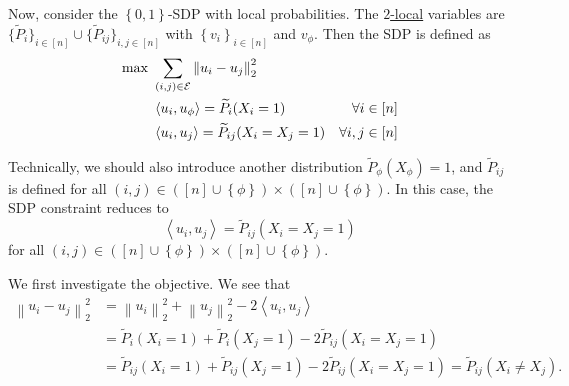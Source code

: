 Now, consider the \(\left\{ 0, 1 \right\} \)-SDP with local probabilities. The \hyperref[def:local-consistency]{\(2\)-local} variables are \(\{ \widetilde{P} _i \} _{i\in [n]} \cup  \{ \widetilde{P} _{ij} \}_{i, j\in [n]} \) with \(\left\{ v_i \right\} _{i\in [n]}\) and \(v_\phi \). Then the SDP is defined as
\[
	\begin{aligned}
		\max~ & \sum_{(i, j)\in \mathcal{\MakeUppercase{e}} }\left\lVert u_i - u_j\right\rVert _2^2                       \\
		      & \left\langle u_i, u_\phi  \right\rangle = \widetilde{P} _i(X_i = 1)                 & \forall i\in [n]    \\
		      & \left\langle u_i, u_j  \right\rangle = \widetilde{P} _{ij}(X_i = X_j = 1)           & \forall i, j\in [n] \\
	\end{aligned}
\]

\begin{remark}
	Technically, we should also introduce another distribution \(\widetilde{P} _{\phi }(X_\phi) = 1\), and \(\widetilde{P} _{ij}\) is defined for all \((i, j)\in ([n]\cup \left\{ \phi  \right\} )\times ([n]\cup \left\{ \phi  \right\} )\). In this case, the SDP constraint reduces to
	\[
		\left\langle  u_i, u_j \right\rangle = \widetilde{P} _{ij}(X_{i} = X_{j} =1)
	\]
	for all \((i, j)\in ([n]\cup \left\{ \phi  \right\} )\times ([n]\cup \left\{ \phi \right\} )\).
\end{remark}

We first investigate the objective. We see that
\[
	\begin{split}
		\left\lVert u_i - u_j\right\rVert _2^2
		&= \left\lVert u_i\right\rVert _2^2 + \left\lVert u_j\right\rVert _2^2 - 2\left\langle u_{i} , u_{j}  \right\rangle \\
		&= \widetilde{P} _i(X_i = 1)+ \widetilde{P} _i(X_j = 1) - 2 \widetilde{P} _{ij} ( X_i = X_j = 1)\\
		&= \widetilde{P} _{ij}(X_i = 1)+ \widetilde{P} _{ij}(X_j = 1) - 2 \widetilde{P} _{ij} ( X_i = X_j = 1)
		= \widetilde{P} _{ij} ( X_i \neq X_j).
	\end{split}
\]

